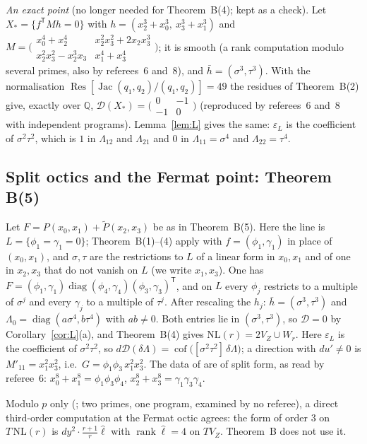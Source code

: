 \documentclass[11pt]{article}
\numberwithin{equation}{section}
\theoremstyle{remark}
\newcommand{\QQ}{\mathbb{Q}}
\newcommand{\NL}{\mathrm{NL}}
\newcommand{\VZ}{V_Z}
\newcommand{\cD}{\mathcal{D}}
\newcommand{\Res}{\operatorname{Res}}
\begin{document}
\emph{An exact point} (no longer needed for Theorem~B(4); kept as a check). Let $X_*=\{f^{\mathsf T}Mh=0\}$
with $h=(x_2^3+x_0^3,\ x_3^3+x_1^3)$ and
$M=\bigl(\begin{smallmatrix}x_0^4+x_2^4& x_2^2x_3^2+2x_2x_3^3\\ x_2^2x_3^2-x_2^3x_3& x_1^4+x_3^4\end{smallmatrix}\bigr)$;
it is smooth (a rank computation modulo several primes, also by referees~6 and~8), and
$\bar h=(\sigma^3,\tau^3)$. With the normalisation $\Res[\operatorname{Jac}(q_1,q_2)/(q_1,q_2)]=49$ the residues
of Theorem~B(2) give, exactly over $\QQ$, $\cD(X_*)=\bigl(\begin{smallmatrix}0&-1\\-1&0\end{smallmatrix}\bigr)$
(reproduced by referees~6 and~8 with independent programs). Lemma~\ref{lem:L} gives the same: $\varepsilon_L$ is
the coefficient of $\sigma^2\tau^2$, which is $1$ in $\Lambda_{12}$ and $\Lambda_{21}$ and $0$ in
$\Lambda_{11}=\sigma^4$ and $\Lambda_{22}=\tau^4$.

\subsection{Split octics and the Fermat point: Theorem B(5)}\label{ss:split}
Let $F=P(x_0,x_1)+\tilde P(x_2,x_3)$ be as in Theorem~B(5). Here the line is $L=\{\phi_1=\gamma_1=0\}$;
Theorem~B(1)--(4) apply with $f=(\phi_1,\gamma_1)$ in place of $(x_0,x_1)$, and $\sigma,\tau$ are the
restrictions to $L$ of a linear form in $x_0,x_1$ and of one in $x_2,x_3$ that do not vanish on $L$ (we write
$x_1,x_3$). One has
$F=(\phi_1,\gamma_1)\operatorname{diag}(\phi_4,\gamma_4)(\phi_3,\gamma_3)^{\mathsf T}$, and on $L$ every $\phi_j$
restricts to a multiple of $\sigma^j$ and every $\gamma_j$ to a multiple of $\tau^j$. After rescaling the
$h_j$: $\bar h=(\sigma^3,\tau^3)$ and $\Lambda_0=\operatorname{diag}(a\sigma^4,b\tau^4)$ with $ab\ne0$. Both
entries lie in $(\sigma^3,\tau^3)$, so $\cD=0$ by Corollary~\ref{cor:L}(a), and Theorem~B(4) gives
$\NL(r)=2\VZ\cup W_r$. Here $\varepsilon_L$ is the coefficient of $\sigma^2\tau^2$, so
$d\cD(\delta\Lambda)=\operatorname{cof}\bigl([\sigma^2\tau^2]\,\delta\Lambda\bigr)$; a direction with
$du'\ne0$ is $M'_{11}=x_1^2x_3^2$, i.e.\ $G=\phi_1\phi_3\,x_1^2x_3^2$. The data of \cite{Mo26} are of split form, as read by referee~6:
$x_0^8+x_1^8=\phi_1\phi_3\phi_4$, $x_2^8+x_3^8=\gamma_1\gamma_3\gamma_4$.

Modulo $p$ only (; two primes, one program, examined by no referee), a direct
third-order computation at the Fermat octic agrees: the form of order $3$ on $T\,\NL(r)$ is
$dy^2\cdot\frac{r+1}{r}\hat\ell$ with $\operatorname{rank}\hat\ell=4$ on $T\VZ$. Theorem~B does not use it.
\end{document}
